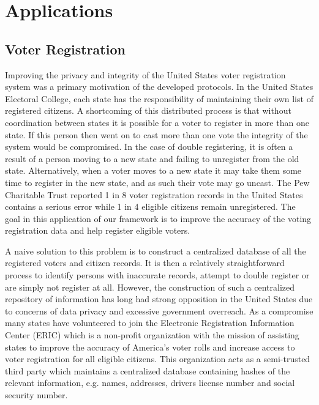 \section{Applications}\label{sec:app}
\subsection{Voter Registration}\label{sec:voter}

Improving the privacy and integrity of the United States voter registration system was a primary motivation of the developed protocols. In  the United States Electoral College, each state has the responsibility of maintaining their own list of registered citizens. A shortcoming of this distributed process is that without coordination between states it is possible for a voter to register in more than one state. If this person then went on to cast more than one vote the integrity of the system would be compromised. In the case of double registering, it is often a result of a person moving to a new state and failing to unregister from the old state. Alternatively, when a voter moves to a new state it may take them some time to register in the new state, and as such their vote may go uncast. The Pew Charitable Trust\cite{pew} reported 1 in 8 voter registration records in the United States contains a serious error while 1 in 4 eligible citizens remain unregistered. The goal in this application of our framework is to improve the accuracy of the voting registration data and help register eligible voters. 

A naive solution to this problem is to construct a centralized database of all the registered voters and citizen records. It is then a relatively straightforward process to identify persons with inaccurate records, attempt to double register or are simply not register at all. However, the construction of such a centralized repository of information has long had strong opposition in the United States due to concerns of data privacy and  excessive government overreach. As a compromise many states have volunteered to join the Electronic Registration Information Center (ERIC)\cite{eric} which is a non-profit organization with the mission of assisting states to improve the accuracy of America’s voter rolls and increase access to voter registration for all eligible citizens. This organization acts as a semi-trusted third party which maintains a centralized database containing hashes of the relevant information, e.g. names, addresses, drivers license number and social security number. 

